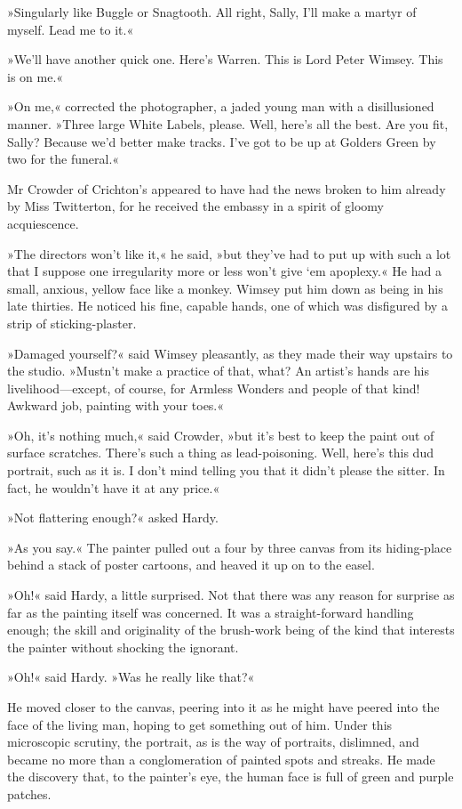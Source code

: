 »Singularly like Buggle or Snagtooth. All right, Sally, I'll make a martyr of myself. Lead me to it.«

»We'll have another quick one. Here's Warren. This is Lord Peter Wimsey. This is on me.«

»On me,« corrected the photographer, a jaded young man with a disillusioned manner. »Three large White Labels, please. Well, here's all the best. Are you fit, Sally? Because we'd better make tracks. I've got to be up at Golders Green by two for the funeral.«

Mr Crowder of Crichton's appeared to have had the news broken to him already by Miss Twitterton, for he received the embassy in a spirit of gloomy acquiescence.

»The directors won't like it,« he said, »but they've had to put up with such a lot that I suppose one irregularity more or less won't give `em apoplexy.« He had a small, anxious, yellow face like a monkey. Wimsey put him down as being in his late thirties. He noticed his fine, capable hands, one of which was disfigured by a strip of sticking-plaster.

»Damaged yourself?« said Wimsey pleasantly, as they made their way upstairs to the studio. »Mustn't make a practice of that, what? An artist's hands are his livelihood—except, of course, for Armless Wonders and people of that kind! Awkward job, painting with your toes.«

»Oh, it's nothing much,« said Crowder, »but it's best to keep the paint out of surface scratches. There's such a thing as lead-poisoning. Well, here's this dud portrait, such as it is. I don't mind telling you that it didn't please the sitter. In fact, he wouldn't have it at any price.«

»Not flattering enough?« asked Hardy.

»As you say.« The painter pulled out a four by three canvas from its hiding-place behind a stack of poster cartoons, and heaved it up on to the easel.

»Oh!« said Hardy, a little surprised. Not that there was any reason for surprise as far as the painting itself was concerned. It was a straight-forward handling enough; the skill and originality of the brush-work being of the kind that interests the painter without shocking the ignorant.

»Oh!« said Hardy. »Was he really like that?«

He moved closer to the canvas, peering into it as he might have peered into the face of the living man, hoping to get something out of him. Under this microscopic scrutiny, the portrait, as is the way of portraits, dislimned, and became no more than a conglomeration of painted spots and streaks. He made the discovery that, to the painter's eye, the human face is full of green and purple patches.

